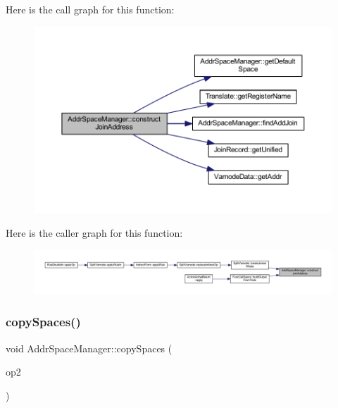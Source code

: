 Here is the call graph for this function\+:
\nopagebreak
\begin{figure}[H]
\begin{center}
\leavevmode
\includegraphics[width=350pt]{class_addr_space_manager_a1cfc5383270584be6e9b974114e65f13_cgraph}
\end{center}
\end{figure}
Here is the caller graph for this function\+:
\nopagebreak
\begin{figure}[H]
\begin{center}
\leavevmode
\includegraphics[width=350pt]{class_addr_space_manager_a1cfc5383270584be6e9b974114e65f13_icgraph}
\end{center}
\end{figure}
\mbox{\label{class_addr_space_manager_a45068bcc8331bebc780f00e51bd85250}} 
\subsubsection{\texorpdfstring{copySpaces()}{copySpaces()}}
{\footnotesize\ttfamily void Addr\+Space\+Manager\+::copy\+Spaces (\begin{DoxyParamCaption}\item[{const \mbox{\hyperlink{class_addr_space_manager}{Addr\+Space\+Manager}} $\ast$}]{op2 }\end{DoxyParamCaption})\hspace{0.3cm}{\ttfamily [protected]}}



